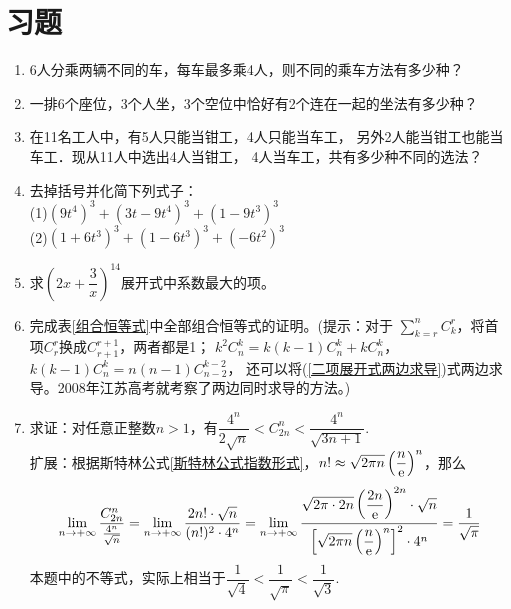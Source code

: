 \section{习题}
\begin{enumerate}[label={\textbf{\arabic*.}},leftmargin=
    \inteval{\myenumleftmargin}pt]
\item 6人分乘两辆不同的车，每车最多乘4人，则不同的乘车方法有多少种？

\item 一排6个座位，3个人坐，3个空位中恰好有2个连在一起的坐法有多少种？

\item 在11名工人中，有5人只能当钳工，4人只能当车工，
另外2人能当钳工也能当车工．现从11人中选出4人当钳工，
4人当车工，共有多少种不同的选法？

\item 去掉括号并化简下列式子：\\
(1)\q $ \left(9t^4\right)^3+\left(3t-9t^4\right)^3+
\left(1-9t^3\right)^3 $ \\
(2)\q $ \left(1+6t^3\right)^3+\left(1-6t^3\right)^3+
\left(-6t^2\right)^3 $

\item 求$ \left(2x+\dfrac{3}{x}\right)^{14} $展开式中系数最大的项。

\item 完成表\ref{组合恒等式}中全部组合恒等式的证明。(提示：对于
$ \sum\limits_{k=r}^{n} C_k^r $，将首项$ C_r^r $换成$ C_{r+1}^{r+1} $，两者都是1；
$ k^2C_n^k=k(k-1)C_n^k+kC_n^k $，$ k(k-1)C_n^k=n(n-1)C_{n-2}^{k-2} $，
还可以将(\ref{二项展开式两边求导})式两边求导。2008年江苏高考就考察了两边同时求导的方法。)

\item 求证：对任意正整数$ n>1 $，有$ \dfrac{4^n}{2\sqrt{n}}<
C_{2n}^{n} < \dfrac{4^n}{\sqrt{3n+1}} $. \\
扩展：根据斯特林公式\eqref{斯特林公式指数形式}，$n!\approx \sqrt{2\pi n}
\left(\dfrac{n}{\mathrm{e}}\right)^n$，那么
\begin{gather*}
    \lim_{n\to+\infty}\dfrac{C_{2n}^n}{\frac{4^n}{\sqrt{n}}}  = \lim_{n\to+\infty}
    \dfrac{2n!\cdot \sqrt{n}}{(n!)^2\cdot 4^n} 
    = \lim_{n\to+\infty} \dfrac{\sqrt{2\pi \cdot 2n}\left(\dfrac{2n}{\mathrm{e}}
        \right)^{2n}\cdot \sqrt{n}}{\left[\sqrt{2\pi n}
        \left(\dfrac{n}{\mathrm{e}}\right)^n\right]^2 \cdot 4^n} = \dfrac{1}{\sqrt{\pi}}    
\end{gather*}
本题中的不等式，实际上相当于$\dfrac{1}{\sqrt{4}}<\dfrac{1}{\sqrt{\pi}}
<\dfrac{1}{\sqrt{3}}$.


\end{enumerate}
